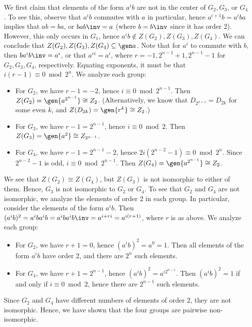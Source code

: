 \begin{sol}
    We first claim that elements of the form $a^ib$ are not in the center of $G_2, G_3$, or $G_4$.
	To see this, observe that $a^ib$ commutes with $a$ in particular, hence $a^{i + 1}b = a^iba$ implies that $ab = ba$, or $bab\inv = a$ (where $b = b\inv$ since it has order 2).
	However, this only occurs in $G_1$, hence $a^ib \notin Z(G_2), Z(G_3), Z(G_4)$.
	We can conclude that $Z(G_2), Z(G_3), Z(G_4) \subseteq \gen a$.
	Note that for $a^i$ to commute with $b$, then $ba^ib\inv = a^i$, or that $a^{ri} = a^i$, where $r = -1, 2^{n - 1} + 1, 2^{n - 1} - 1$ for $G_2, G_3, G_4$, respectively.
	Equating exponents, it must be that $i(r - 1) \equiv 0 \bmod 2^n$.
	We analyze each group:
    \begin{itemize}
        \item For $G_2$, we have $r - 1 = -2$, hence $i \equiv 0 \bmod 2^{n - 1}$.
	Then $Z(G_2) = \gen{a^{2^{n - 1}}} \cong Z_2$. (Alternatively, we know that $D_{2^{n + 1}} = D_{2k}$ for some even $k$, and $Z(D_{2k}) = \gen{r^k} \cong Z_2$.)
        \item For $G_3$, we have $r - 1 = 2^{n - 1}$, hence $i \equiv 0 \bmod 2$.
	Then $Z(G_3) = \gen{a^2} \cong Z_{2^{n - 1}}$.
        \item For $G_4$, we have $r - 1 = 2^{n - 1} - 2$, hence $2i(2^{n - 2} - 1) \equiv 0 \bmod 2^n$.
	Since $2^{n - 2} - 1$ is odd, $i \equiv 0 \bmod 2^{n - 1}$.
	Then $Z(G_4) = \gen{a^{2^{n - 1}}} \cong Z_2$.
    \end{itemize}
    We see that $Z(G_2) \cong Z(G_4)$, but $Z(G_3)$ is not isomorphic to either of them.
	Hence, $G_3$ is not isomorphic to $G_2$ or $G_4$.
	To see that $G_2$ and $G_4$ are not isomorphic, we analyze the elements of order 2 in each group.
	In particular, consider the elements of the form $a^ib$.
	Then $(a^ib)^2 = a^iba^ib = a^iba^ib\inv = a^{i + ri} = a^{i(r + 1)}$, where $r$ is as above.
	We analyze each group:
    \begin{itemize}
        \item For $G_2$, we have $r + 1 = 0$, hence $(a^ib)^2 = a^0 = 1$.
	Then all elements of the form $a^ib$ have order 2, and there are $2^n$ such elements.
        \item For $G_4$, we have $r + 1 = 2^{n - 1}$, hence $(a^ib)^2 = a^{i2^{n - 1}}$.
	Then $(a^ib)^2 = 1$ if and only if $i \equiv 0 \bmod 2$, hence there are $2^{n - 1}$ such elements.
    \end{itemize}
    Since $G_2$ and $G_4$ have different numbers of elements of order 2, they are not isomorphic.
	Hence, we have shown that the four groups are pairwise non-isomorphic.
\end{sol}


